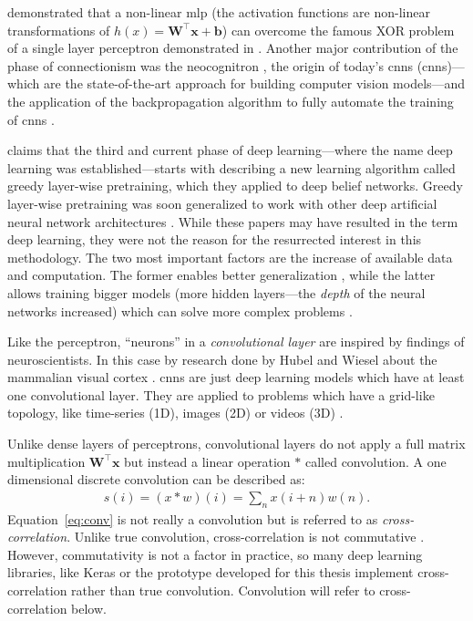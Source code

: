 \documentclass[]{article}
\begin{document}
\citet{hornik_et_al_1989} demonstrated that a non-linear \acrshort{mlp}
(the activation functions are non-linear transformations of
$h(x) = \mathbf{W}^\top\mathbf{x} + \mathbf{b}$) can overcome the
famous XOR problem of a single layer perceptron demonstrated in
\citet{minsky_et_al_1969}.
Another major contribution of the phase of connectionism was the
neocognitron \citep{fukushima_1980}, the origin of today's
\acrlong{cnn}s (\acrshort{cnn}s)---which are the
state-of-the-art approach for building computer vision models---and
the application of the backpropagation algorithm to fully automate the
training of \acrshort{cnn}s \citep{lecun_et_al_1989}.

\citet{goodfellow_et_al_2016} claims that the third and current phase
of deep learning---where the name deep learning was
established---starts with \citet{hinton_et_al_2006} describing a new
learning algorithm called greedy layer-wise pretraining, which they
applied to deep belief networks.
Greedy layer-wise pretraining was soon generalized to work with other
deep artificial neural network architectures
\citep{renzato_et_al_2006, bengio_et_al_2007}.
While these papers may have resulted in the term deep learning,
they were not the reason for the resurrected interest in this
methodology.
The two most important factors are the increase of available data
and computation.
The former enables better generalization
\citep{goodfellow_et_al_2016}, while the latter allows
training bigger models (more hidden layers---the \textit{depth} of the
neural networks increased) which can solve more complex problems
\citep{bengio_et_al_2007a, goodfellow_et_al_2016}.

Like the perceptron, ``neurons'' in a \textit{convolutional layer}
are inspired by findings of neuroscientists.
In this case by research done by Hubel and Wiesel about the
mammalian visual cortex
\citep{hubel_et_al_1959, hubel_et_al_1962, hubel_et_al_1968}.
\acrshort{cnn}s are just deep learning models which have at least one
convolutional layer. They are applied to problems which have a
grid-like topology, like time-series (1D), images (2D) or videos (3D)
\citep{goodfellow_et_al_2016}.

Unlike dense layers of perceptrons, convolutional layers do not apply
a full matrix multiplication $\mathbf{W}^\top\mathbf{x}$ but instead
a linear operation $*$ called convolution.
A one dimensional discrete convolution can be described as:
\begin{align}
  \label{eq:conv}
  s(i) = (x * w)(i) = \sum_n x(i + n)w(n).
\end{align}
Equation~\ref{eq:conv} is not really a convolution but is referred to
as \textit{cross-correlation}.
Unlike true convolution, cross-correlation is not commutative
\citep{goodfellow_et_al_2016}.
However, commutativity is not a factor in practice, so many deep
learning libraries, like Keras \citep{keras} or the prototype
developed for this thesis implement cross-correlation rather than true
convolution.
Convolution will refer to cross-correlation below.
\end{document}
